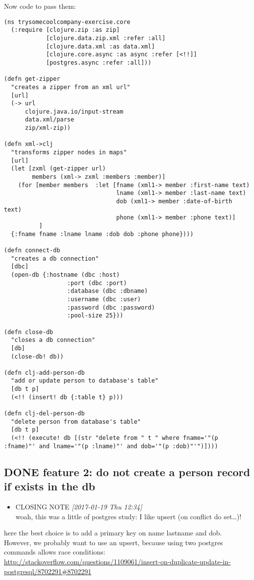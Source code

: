 \documentclass[11pt]{article}
\begin{document}
Now code to pass them:

\begin{verbatim}
(ns trysomecoolcompany-exercise.core
  (:require [clojure.zip :as zip]
            [clojure.data.zip.xml :refer :all]
            [clojure.data.xml :as data.xml]
            [clojure.core.async :as async :refer [<!!]]
            [postgres.async :refer :all]))

(defn get-zipper 
  "creates a zipper from an xml url"
  [url]
  (-> url
      clojure.java.io/input-stream
      data.xml/parse
      zip/xml-zip))

(defn xml->clj
  "transforms zipper nodes in maps"
  [url]
  (let [zxml (get-zipper url)
        members (xml-> zxml :members :member)]
    (for [member members  :let [fname (xml1-> member :first-name text)
                                lname (xml1-> member :last-name text)
                                dob (xml1-> member :date-of-birth text)
                                phone (xml1-> member :phone text)]
          ]
  {:fname fname :lname lname :dob dob :phone phone})))

(defn connect-db
  "creates a db connection"
  [dbc]
  (open-db {:hostname (dbc :host)
                  :port (dbc :port)
                  :database (dbc :dbname)
                  :username (dbc :user)
                  :password (dbc :password)
                  :pool-size 25}))

(defn close-db
  "closes a db connection"
  [db]
  (close-db! db))

(defn clj-add-person-db
  "add or update person to database's table"
  [db t p]
  (<!! (insert! db {:table t} p)))

(defn clj-del-person-db
  "delete person from database's table"
  [db t p]
  (<!! (execute! db [(str "delete from " t " where fname='"(p :fname)"' and lname='"(p :lname)"' and dob='"(p :dob)"'")])))
\end{verbatim}

\subsection{{\bfseries\sffamily DONE} feature 2: do not create a person record if exists in the db}
\label{sec:org05fb58d}
\begin{itemize}
\item CLOSING NOTE \textit{[2017-01-19 Thu 12:34] } \\
woah, this was a little of postgres study: I like upsert (on conflict do set\ldots{})!
\end{itemize}
here the best choice is to add a primary key on name lastname and dob.
However, we probably want to use an upsert, because using two postgres
commands allows race conditions:
\url{http://stackoverflow.com/questions/1109061/insert-on-duplicate-update-in-postgresql/8702291\#8702291}
\end{document}
